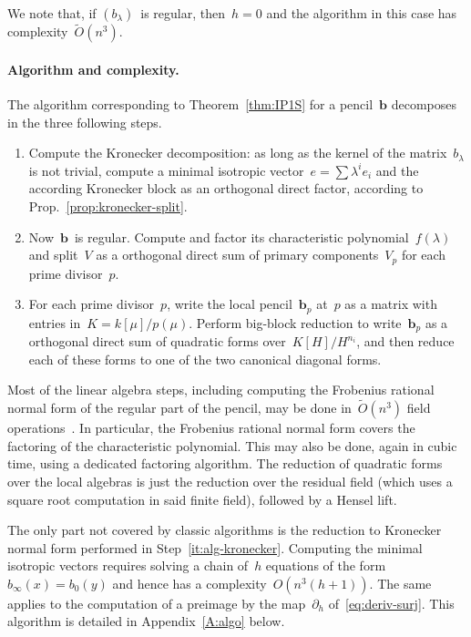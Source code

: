\documentclass{lms}%
\newif\ifappendix \appendixtrue
\def\Ot{\widetilde{O}}
\begin{document}
We note that, if $(b_{λ})$~is regular, then~$h = 0$ and the algorithm in
this case has complexity~$\Ot(n^3)$.

\paragraph{Algorithm and complexity.}

The algorithm corresponding to Theorem~\ref{thm:IP1S} for a
pencil~$\bm{b}$ decomposes in the three following steps.

\begin{enumerate}
\item \label{it:alg-kronecker} Compute the Kronecker decomposition: as
long as the kernel of the matrix~$b_{λ}$ is not trivial, compute a
minimal isotropic vector~$e = ∑ λ^i e_i$ and the according Kronecker
block as an orthogonal direct factor, according to
Prop.~\ref{prop:kronecker-split}.
\item \label{it:alg-factor} Now~$\bm{b}$~is regular. Compute and factor
its characteristic polynomial~$f(λ)$ and split~$V$ as a orthogonal direct
sum of primary components~$V_p$ for each prime divisor~$p$.
\item \label{it:alg-local} For each prime divisor~$p$, write the local
pencil~$\bm{b}_p$ at~$p$ as a matrix with entries in~$K = k[μ]/p(μ)$.
Perform big-block reduction to write~$\bm{b}_p$ as a orthogonal direct
sum of quadratic forms over~$K[H]/H^{n_i}$, and then reduce
each of these forms to one of the two canonical diagonal forms.
\end{enumerate}

Most of the linear algebra steps, including computing the Frobenius
rational normal form of the regular part of the pencil, may be done
in~$\Ot(n^3)$ field operations~\cite{kaltoffen11compute}. In particular,
the Frobenius rational normal form covers the factoring of the
characteristic polynomial. This may also be done, again in cubic time,
using a dedicated factoring algorithm. The reduction of quadratic forms
over the local algebras is just the reduction over the residual field
(which uses a square root computation in said finite field), followed by
a Hensel lift.

The only part not covered by classic algorithms is the reduction to
Kronecker normal form performed in Step~\ref{it:alg-kronecker}. Computing
the minimal isotropic vectors requires solving a chain of~$h$ equations
of the form~$b_{∞}(x) = b_0(y)$ and hence has a complexity~$O(n^3(h+1))$.
The same applies to the computation of a preimage by the map~$∂_h$
of~\eqref{eq:deriv-surj}. \ifappendix This algorithm is detailed in
Appendix~\ref{A:algo} below. \fi
\end{document}

